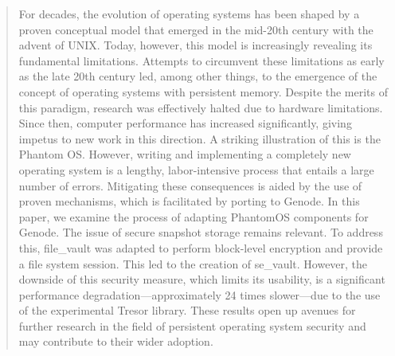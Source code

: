 \begin{abstract}
For decades, the evolution of operating systems has been shaped by a proven conceptual model that emerged in the mid-20th century with the advent of UNIX. Today, however, this model is increasingly revealing its fundamental limitations. Attempts to circumvent these limitations as early as the late 20th century led, among other things, to the emergence of the concept of operating systems with persistent memory. Despite the merits of this paradigm, research was effectively halted due to hardware limitations. Since then, computer performance has increased significantly, giving impetus to new work in this direction. A striking illustration of this is the Phantom OS. However, writing and implementing a completely new operating system is a lengthy, labor-intensive process that entails a large number of errors. Mitigating these consequences is aided by the use of proven mechanisms, which is facilitated by porting to Genode. In this paper, we examine the process of adapting PhantomOS components for Genode. The issue of secure snapshot storage remains relevant. To address this, file\_vault was adapted to perform block-level encryption and provide a file system session. This led to the creation of se\_vault. However, the downside of this security measure, which limits its usability, is a significant performance degradation—approximately 24 times slower—due to the use of the experimental Tresor library. These results open up avenues for further research in the field of persistent operating system security and may contribute to their wider adoption.

\end{abstract}